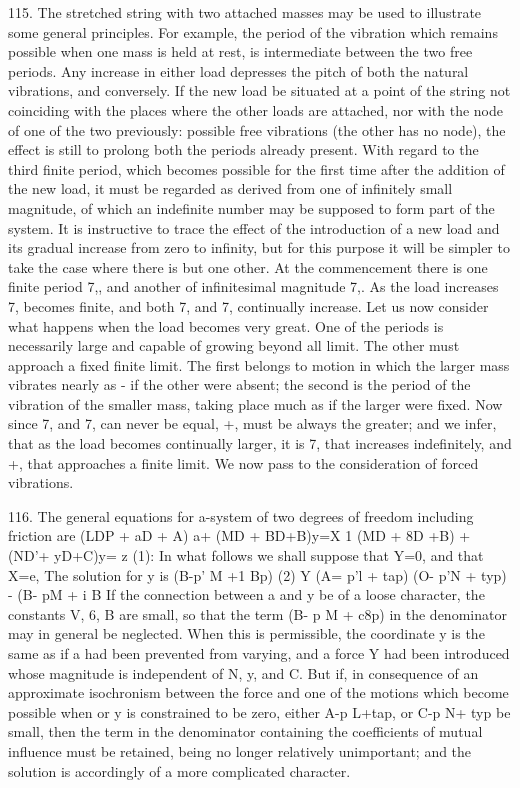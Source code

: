 115. The stretched string with two attached masses may be used to illustrate
some general principles. For example, the period of the vibration which remains
possible when one mass is held at rest, is intermediate between the two free
periods. Any increase in either load depresses the pitch of both the natural
vibrations, and conversely. If the new load be situated at a point of the
string not coinciding with the places where the other loads are attached, nor
with the node of one of the two previously: possible free vibrations (the other
has no node), the effect is still to prolong both the periods already present.
With regard to the third finite period, which becomes possible for the first
time after the addition of the new load, it must be regarded as derived from
one of infinitely small magnitude, of which an indefinite number may be
supposed to form part of the system. It is instructive to trace the effect of
the introduction of a new load and its gradual increase from zero to infinity,
but for this purpose it will be simpler to take the case where there is but one
other. At the commencement there is one finite period 7,, and another of
infinitesimal magnitude 7,. As the load increases 7, becomes finite, and both
7, and 7, continually increase.  Let us now consider what happens when the load
becomes very great. One of the periods is necessarily large and capable of
growing beyond all limit. The other must approach a fixed finite limit. The
first belongs to motion in which the larger mass vibrates nearly as - if the
other were absent; the second is the period of the vibration of the smaller
mass, taking place much as if the larger were fixed. Now since 7, and 7, can
never be equal, +, must be always the greater; and we infer, that as the load
becomes continually larger, it is 7, that increases indefinitely, and +, that
approaches a finite limit. We now pass to the consideration of forced
vibrations.

116. The general equations for a-system of two degrees of freedom including
friction are (LDP + aD + A) a+ (MD + BD+B)y=X 1 (MD + 8D +B) + (ND'+ yD+C)y= z
(1): In what follows we shall suppose that Y=0, and that X=e, The solution for
y is (B-p' M +1 Bp) (2) Y (A= p'l + tap) (O- p'N + typ) - (B- pM + i B If the
connection between a and y be of a loose character, the constants V, 6, B are
small, so that the term (B- p M + c8p) in the denominator may in general be
neglected. When this is permissible, the coordinate y is the same as if a had
been prevented from varying, and a force Y had been introduced whose magnitude
is independent of N, y, and C. But if, in consequence of an approximate
isochronism between the force and one of the motions which become possible when
or y is constrained to be zero, either A-p L+tap, or C-p N+ typ be small, then
the term in the denominator containing the coefficients of mutual influence
must be retained, being no longer relatively unimportant; and the solution is
accordingly of a more complicated character.

